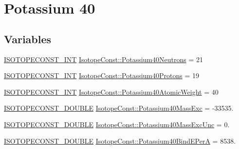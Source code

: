 \hypertarget{group___isotope_const-_potassium-_k40}{}\section{Potassium 40}
\label{group___isotope_const-_potassium-_k40}
\subsection*{Variables}
\begin{DoxyCompactItemize}
\item 
\mbox{\hyperlink{group___isotope_const-_macros_ga5f18360b3e99483a35c32d789e62621c}{I\+S\+O\+T\+O\+P\+E\+C\+O\+N\+S\+T\+\_\+\+I\+NT}} \mbox{\hyperlink{group___isotope_const-_potassium-_k40_ga9a5d54c76d82faec0db02b83d116deb7}{Isotope\+Const\+::\+Potassium40\+Neutrons}} = 21
\item 
\mbox{\hyperlink{group___isotope_const-_macros_ga5f18360b3e99483a35c32d789e62621c}{I\+S\+O\+T\+O\+P\+E\+C\+O\+N\+S\+T\+\_\+\+I\+NT}} \mbox{\hyperlink{group___isotope_const-_potassium-_k40_ga2dbfd84a64986b8ff0d5b1699a1cc73c}{Isotope\+Const\+::\+Potassium40\+Protons}} = 19
\item 
\mbox{\hyperlink{group___isotope_const-_macros_ga5f18360b3e99483a35c32d789e62621c}{I\+S\+O\+T\+O\+P\+E\+C\+O\+N\+S\+T\+\_\+\+I\+NT}} \mbox{\hyperlink{group___isotope_const-_potassium-_k40_ga5e3cc26878a0d8abccc506398d74a8e0}{Isotope\+Const\+::\+Potassium40\+Atomic\+Weight}} = 40
\item 
\mbox{\hyperlink{group___isotope_const-_macros_ga8f45a7272ce02c0b4c65c44636ed719a}{I\+S\+O\+T\+O\+P\+E\+C\+O\+N\+S\+T\+\_\+\+D\+O\+U\+B\+LE}} \mbox{\hyperlink{group___isotope_const-_potassium-_k40_ga3cec33408ada2b1ab3b412ab5b810436}{Isotope\+Const\+::\+Potassium40\+Mass\+Exc}} = -\/33535.
\item 
\mbox{\hyperlink{group___isotope_const-_macros_ga8f45a7272ce02c0b4c65c44636ed719a}{I\+S\+O\+T\+O\+P\+E\+C\+O\+N\+S\+T\+\_\+\+D\+O\+U\+B\+LE}} \mbox{\hyperlink{group___isotope_const-_potassium-_k40_gaf873a926b25822db7d8591dd9848e2c9}{Isotope\+Const\+::\+Potassium40\+Mass\+Exc\+Unc}} = 0.
\item 
\mbox{\hyperlink{group___isotope_const-_macros_ga8f45a7272ce02c0b4c65c44636ed719a}{I\+S\+O\+T\+O\+P\+E\+C\+O\+N\+S\+T\+\_\+\+D\+O\+U\+B\+LE}} \mbox{\hyperlink{group___isotope_const-_potassium-_k40_ga8b2b32f503208718826da440f64435ce}{Isotope\+Const\+::\+Potassium40\+Bind\+E\+PerA}} = 8538.
\item 

\end{DoxyCompactItemize}
